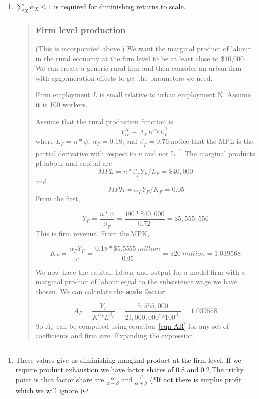 \begin{enumerate}
\item $\sum_X \alpha_X \le 1$ is required for diminishing returns to scale. 


\begin{quotation} \color{orange}
\subsubsection{Firm level production}   
(This is incorporated above.) We want the marginal product of labour in the rural economy at the firm level to be at least close to \$40,000.  We can create a generic rural firm and then consider an urban firm with agglomeration effects to get the parameters we need. 

Firm employment $L$ is small relative to  urban employment {N}. Assume it is 100 workers. 

Assume that the rural production function is 
\[ Y_{iF}^R=A_{F} K^{\alpha_F} L_F^{\beta_F} \]
where  $L_F=n*\psi$, $\alpha_F=0.18 $,  and $\beta_F=0.76$.notice that the MPL is the partial derivative with respect to $n$ and not L. 
\footnote{These values give us diminishing marginal product at the firm level. If we require product exhaustion we have factor shares of  0.8 and 0.2.The tricky point is that factor share are 
 $\frac{\alpha}{\alpha + \beta}$ and $\frac{\beta}{\alpha + \beta}$
(*If not there is surplus profit  which we will ignore.)}   
The marginal products pf labour and capital are 
\[MPL=n*\beta_F Y_F/L_F=\$40,000\] and\[\ MPK=\alpha_F Y_F/K_F =0.05\]
From the first, 

\[Y_F=\frac{n*\psi}{\beta_F}=\frac{100*\$40,000}{0.72}=\$5,555,556\]
This is firm revenue. From the MPK, 

\[K_F=  \frac{\alpha_F Y_F }{r}=\frac{0.18 *\$5.5555\ million}{0.05} =\$20\ million = 1.039568 \]

We now have the capital, labour and output for a model firm with a marginal product of labour  equal to the subsistence wage we have chosen. We can calculate the \textbf{scale factor} 

\begin{equation}  
A_F= \frac{Y_F}{K^{\alpha_F} L^{\beta_F}}=\frac{5,555,000}{20,000,000^{\alpha_F} 100^{\beta_F}} = 1.039568 \label{eqn-AR}\end{equation} 
So $A_F$ can be computed using equation~\ref{eqn-AR} for any set of coefficients and firm size. Expanding the expression,


\end{quotation}
\end{enumerate}

